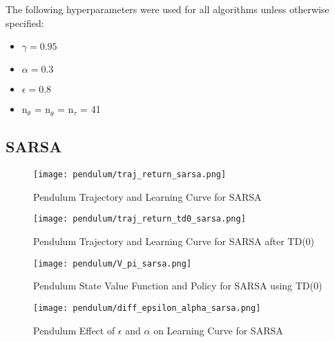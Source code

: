The following hyperparameters were used for all algorithms unless otherwise specified:
\begin{itemize}
    \item $\gamma = 0.95$
    \item $\alpha = 0.3$
    \item $\epsilon = 0.8$
    \item n$_{\theta}$ = n$_{\dot{\theta}}$ = n{$_\tau$} = 41
\end{itemize}

\subsection*{SARSA}
\begin{figure}[ht]
\centering
\texttt{[image: pendulum/traj\_return\_sarsa.png]}
\caption{Pendulum Trajectory and Learning Curve for SARSA}
\label{fig:pendulum_traj_return_sarsa}
\end{figure}

\begin{figure}[ht]
\centering
\texttt{[image: pendulum/traj\_return\_td0\_sarsa.png]}
\caption{Pendulum Trajectory and Learning Curve for SARSA after TD(0)}
\label{fig:pendulum_traj_return_td0_sarsa}
\end{figure}

\begin{figure}[ht]
\centering
\texttt{[image: pendulum/V\_pi\_sarsa.png]}
\caption{Pendulum State Value Function and Policy for SARSA using TD(0)}
\label{fig:pendulum_V_pi_sarsa}
\end{figure}

\begin{figure}
\centering
\texttt{[image: pendulum/diff\_epsilon\_alpha\_sarsa.png]}
\caption{Pendulum Effect of $\epsilon$ and $\alpha$ on Learning Curve for SARSA}
\label{fig:pendulum_diff_epsilon_alpha_sarsa}
\end{figure}

